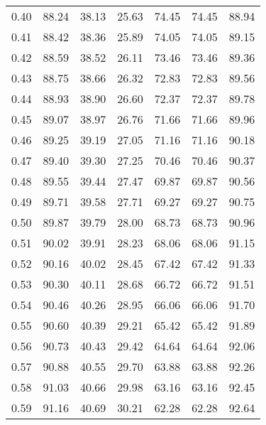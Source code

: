 \begin{tabular}{|c|c|c|c|c|c|c|}
      0.40 &     88.24 &     38.13 &      25.63 &   74.45 &      74.45 &         88.94 \\
      0.41 &     88.42 &     38.36 &      25.89 &   74.05 &      74.05 &         89.15 \\
      0.42 &     88.59 &     38.52 &      26.11 &   73.46 &      73.46 &         89.36 \\
      0.43 &     88.75 &     38.66 &      26.32 &   72.83 &      72.83 &         89.56 \\
      0.44 &     88.93 &     38.90 &      26.60 &   72.37 &      72.37 &         89.78 \\
      0.45 &     89.07 &     38.97 &      26.76 &   71.66 &      71.66 &         89.96 \\
      0.46 &     89.25 &     39.19 &      27.05 &   71.16 &      71.16 &         90.18 \\
      0.47 &     89.40 &     39.30 &      27.25 &   70.46 &      70.46 &         90.37 \\
      0.48 &     89.55 &     39.44 &      27.47 &   69.87 &      69.87 &         90.56 \\
      0.49 &     89.71 &     39.58 &      27.71 &   69.27 &      69.27 &         90.75 \\
      0.50 &     89.87 &     39.79 &      28.00 &   68.73 &      68.73 &         90.96 \\
      0.51 &     90.02 &     39.91 &      28.23 &   68.06 &      68.06 &         91.15 \\
      0.52 &     90.16 &     40.02 &      28.45 &   67.42 &      67.42 &         91.33 \\
      0.53 &     90.30 &     40.11 &      28.68 &   66.72 &      66.72 &         91.51 \\
      0.54 &     90.46 &     40.26 &      28.95 &   66.06 &      66.06 &         91.70 \\
      0.55 &     90.60 &     40.39 &      29.21 &   65.42 &      65.42 &         91.89 \\
      0.56 &     90.73 &     40.43 &      29.42 &   64.64 &      64.64 &         92.06 \\
      0.57 &     90.88 &     40.55 &      29.70 &   63.88 &      63.88 &         92.26 \\
      0.58 &     91.03 &     40.66 &      29.98 &   63.16 &      63.16 &         92.45 \\
      0.59 &     91.16 &     40.69 &      30.21 &   62.28 &      62.28 &         92.64 \\

\end{tabular}
